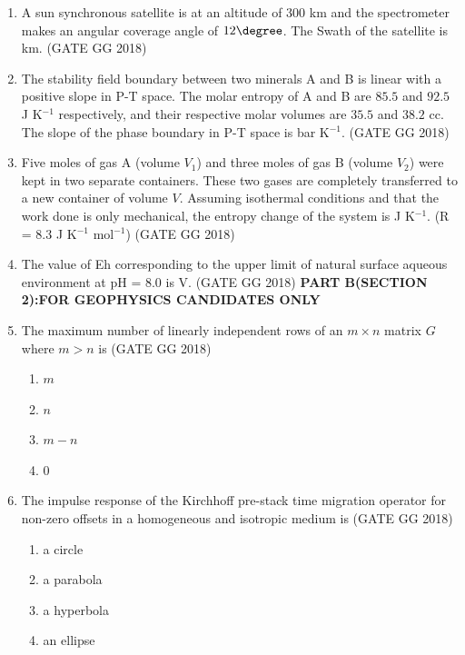 \documentclass[journal]{IEEEtran}
\begin{document}
\begin{enumerate}[start=1]
\item A sun synchronous satellite is at an altitude of $300$ km and the spectrometer makes an  angular coverage angle of $12\degree$. The Swath  of the satellite is \makebox[2cm]{\hrulefill} km.
\hfill(GATE GG 2018)
\vspace{0.5cm}
\item The stability field boundary between two minerals A and B is linear with a positive slope in P-T space. The molar entropy of A and B are $85.5$ and $92.5$ J K$^{-1}$ respectively, and their respective molar volumes are $35.5$ and $38.2$ cc.  
The slope of the phase boundary in P-T space is \makebox[2cm]{\hrulefill} bar K$^{-1}$.
\hfill(GATE GG 2018)
\vspace{0.5cm}

\item Five moles of gas A (volume $V_1$) and three moles of gas B (volume $V_2$) were kept in two separate containers. These two gases are completely transferred to a new container of volume $V$. Assuming isothermal conditions and that the work done is only mechanical,  the entropy change of the system is \makebox[2cm]{\hrulefill} J K$^{-1}$. (R = 8.3 J K$^{-1}$ mol$^{-1}$)
\hfill(GATE GG 2018)
\vspace{0.5cm}

\item The value of Eh corresponding to the upper limit of natural surface aqueous environment at pH = $8.0$ is \makebox[2cm]{\hrulefill}  V.
\hspace*{15.7cm}(GATE GG 2018)
\textbf{PART B(SECTION 2):FOR GEOPHYSICS CANDIDATES ONLY}
\vspace{1cm}
\item The maximum number of linearly independent rows of an $m \times n$ matrix $G$ where $m>n$ is
\hfill(GATE GG 2018)
\begin{multicols}{2}
\begin{enumerate}
\item $m$
\item $n$
\item $m-n$
\item 0
\end{enumerate}
\end{multicols}

\item The impulse response of the Kirchhoff pre-stack time migration operator for non-zero offsets in a homogeneous and isotropic medium is
\hfill(GATE GG 2018)
\begin{multicols}{2}
\begin{enumerate}
\item a circle
\item a parabola
\item a hyperbola
\item an ellipse
\end{enumerate}
\end{multicols}


\end{enumerate}
\end{document}
